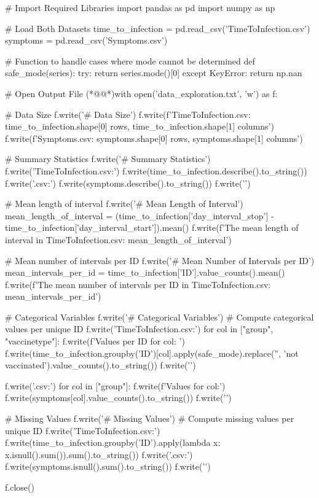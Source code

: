\documentclass[11pt]{article}
\begin{document}
\begin{python}

# Import Required Libraries
import pandas as pd
import numpy as np

# Load Both Datasets
time_to_infection = pd.read_csv('TimeToInfection.csv')
symptoms = pd.read_csv('Symptoms.csv')

# Function to handle cases where mode cannot be determined
def safe_mode(series):
    try:
        return series.mode()[0]
    except KeyError:
        return np.nan

# Open Output File
(*@@*)with open('data_exploration.txt', 'w') as f:

    # Data Size
    f.write('# Data Size\n')
    f.write(f'TimeToInfection.csv: {time_to_infection.shape[0]} rows, {time_to_infection.shape[1]} columns\n')
    f.write(f'Symptoms.csv: {symptoms.shape[0]} rows, {symptoms.shape[1]} columns\n\n')

    # Summary Statistics
    f.write('# Summary Statistics\n')
    f.write('TimeToInfection.csv:\n')
    f.write(time_to_infection.describe().to_string())
    f.write('\n\nSymptoms.csv:\n')
    f.write(symptoms.describe().to_string())
    f.write('\n\n')
    
    # Mean length of interval
    f.write('# Mean Length of Interval\n')
    mean_length_of_interval = (time_to_infection['day_interval_stop'] - time_to_infection['day_interval_start']).mean()
    f.write(f'The mean length of interval in TimeToInfection.csv: {mean_length_of_interval}\n\n')
    
    # Mean number of intervals per ID
    f.write('# Mean Number of Intervals per ID\n')
    mean_intervals_per_id = time_to_infection['ID'].value_counts().mean()
    f.write(f'The mean number of intervals per ID in TimeToInfection.csv: {mean_intervals_per_id}\n\n')

    # Categorical Variables
    f.write('# Categorical Variables\n')
    # Compute categorical values per unique ID
    f.write('TimeToInfection.csv:\n')
    for col in ["group", "vaccinetype"]:
        f.write(f'Values per ID for {col}: \n')
        f.write(time_to_infection.groupby('ID')[col].apply(safe_mode).replace('', 'not vaccinated').value_counts().to_string())
        f.write('\n')

    f.write('\nSymptoms.csv:\n')
    for col in ["group"]:
        f.write(f'Values for {col}:\n')
        f.write(symptoms[col].value_counts().to_string())
        f.write('\n')

    # Missing Values
    f.write('\n# Missing Values\n')
    # Compute missing values per unique ID
    f.write('TimeToInfection.csv:\n')
    f.write(time_to_infection.groupby('ID').apply(lambda x: x.isnull().sum()).sum().to_string())
    f.write('\n\nSymptoms.csv:\n')
    f.write(symptoms.isnull().sum().to_string())
    f.write('\n')

f.close()

\end{python}
\end{document}
